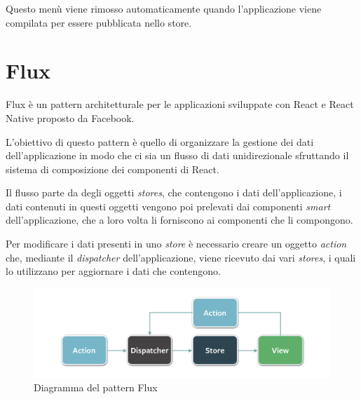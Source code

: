 Questo menù viene rimosso automaticamente quando l'applicazione viene compilata per essere pubblicata nello store.

\section{Flux}\label{sec:flux}
Flux è un pattern architetturale per le applicazioni sviluppate con React e React Native proposto da Facebook.

L'obiettivo di questo pattern è quello di organizzare la gestione dei dati dell'applicazione in modo che ci sia un flusso di dati unidirezionale sfruttando il sistema di composizione dei componenti di React.

Il flusso parte da degli oggetti \textit{stores}, che contengono i dati dell'applicazione, i dati contenuti in questi oggetti vengono poi prelevati dai componenti \textit{smart} dell'applicazione, che a loro volta li forniscono ai componenti che li compongono.

Per modificare i dati presenti in uno \textit{store} è necessario creare un oggetto \textit{action} che, mediante il \textit{dispatcher} dell'applicazione, viene ricevuto dai vari \textit{stores}, i quali lo utilizzano per aggiornare i dati che contengono.


\begin{figure}[htp]
\centering
\includegraphics[width=\textwidth*3/4]{../immagini/flux-simple}
\caption{Diagramma del pattern Flux}  
\end{figure}
\FloatBarrier

